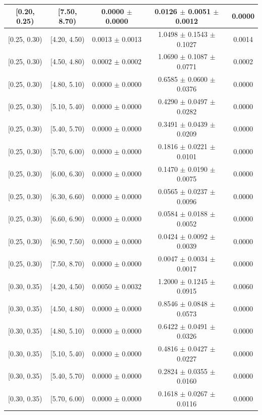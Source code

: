\begin{longtable}{|c|c|c|c|c|}
\hline
[0.20, 0.25) & [7.50, 8.70) & 0.0000 $\pm$ 0.0000 & 0.0126 $\pm$ 0.0051 $\pm$ 0.0012 & 0.0000 \\ 
\hline
[0.25, 0.30) & [4.20, 4.50) & 0.0013 $\pm$ 0.0013 & 1.0498 $\pm$ 0.1543 $\pm$ 0.1027 & 0.0014 \\ 
\hline
[0.25, 0.30) & [4.50, 4.80) & 0.0002 $\pm$ 0.0002 & 1.0690 $\pm$ 0.1087 $\pm$ 0.0771 & 0.0002 \\ 
\hline
[0.25, 0.30) & [4.80, 5.10) & 0.0000 $\pm$ 0.0000 & 0.6585 $\pm$ 0.0600 $\pm$ 0.0376 & 0.0000 \\ 
\hline
[0.25, 0.30) & [5.10, 5.40) & 0.0000 $\pm$ 0.0000 & 0.4290 $\pm$ 0.0497 $\pm$ 0.0282 & 0.0000 \\ 
\hline
[0.25, 0.30) & [5.40, 5.70) & 0.0000 $\pm$ 0.0000 & 0.3491 $\pm$ 0.0439 $\pm$ 0.0209 & 0.0000 \\ 
\hline
[0.25, 0.30) & [5.70, 6.00) & 0.0000 $\pm$ 0.0000 & 0.1816 $\pm$ 0.0221 $\pm$ 0.0101 & 0.0000 \\ 
\hline
[0.25, 0.30) & [6.00, 6.30) & 0.0000 $\pm$ 0.0000 & 0.1470 $\pm$ 0.0190 $\pm$ 0.0075 & 0.0000 \\ 
\hline
[0.25, 0.30) & [6.30, 6.60) & 0.0000 $\pm$ 0.0000 & 0.0565 $\pm$ 0.0237 $\pm$ 0.0096 & 0.0000 \\ 
\hline
[0.25, 0.30) & [6.60, 6.90) & 0.0000 $\pm$ 0.0000 & 0.0584 $\pm$ 0.0188 $\pm$ 0.0052 & 0.0000 \\ 
\hline
[0.25, 0.30) & [6.90, 7.50) & 0.0000 $\pm$ 0.0000 & 0.0424 $\pm$ 0.0092 $\pm$ 0.0039 & 0.0000 \\ 
\hline
[0.25, 0.30) & [7.50, 8.70) & 0.0000 $\pm$ 0.0000 & 0.0047 $\pm$ 0.0034 $\pm$ 0.0017 & 0.0000 \\ 
\hline
[0.30, 0.35) & [4.20, 4.50) & 0.0050 $\pm$ 0.0032 & 1.2000 $\pm$ 0.1245 $\pm$ 0.0915 & 0.0060 \\ 
\hline
[0.30, 0.35) & [4.50, 4.80) & 0.0000 $\pm$ 0.0000 & 0.8546 $\pm$ 0.0848 $\pm$ 0.0573 & 0.0000 \\ 
\hline
[0.30, 0.35) & [4.80, 5.10) & 0.0000 $\pm$ 0.0000 & 0.6422 $\pm$ 0.0491 $\pm$ 0.0326 & 0.0000 \\ 
\hline
[0.30, 0.35) & [5.10, 5.40) & 0.0000 $\pm$ 0.0000 & 0.4816 $\pm$ 0.0427 $\pm$ 0.0227 & 0.0000 \\ 
\hline
[0.30, 0.35) & [5.40, 5.70) & 0.0000 $\pm$ 0.0000 & 0.2824 $\pm$ 0.0355 $\pm$ 0.0160 & 0.0000 \\ 
\hline
[0.30, 0.35) & [5.70, 6.00) & 0.0000 $\pm$ 0.0000 & 0.1618 $\pm$ 0.0267 $\pm$ 0.0116 & 0.0000 \\ 

\end{longtable}
